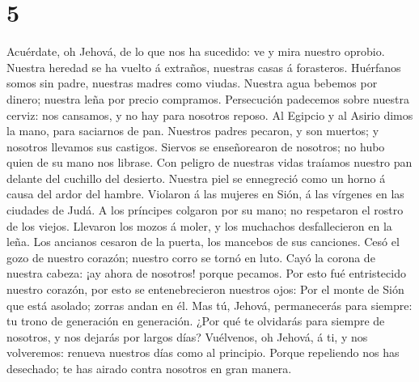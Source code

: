 \hypertarget{section-4}{%
\section{5}\label{section-4}}

 Acuérdate, oh Jehová, de lo que nos ha sucedido: ve y mira
nuestro oprobio.  Nuestra heredad se ha vuelto á extraños,
nuestras casas á forasteros.  Huérfanos somos sin padre,
nuestras madres como viudas.  Nuestra agua bebemos por
dinero; nuestra leña por precio compramos.  Persecución
padecemos sobre nuestra cerviz: nos cansamos, y no hay para nosotros
reposo.  Al Egipcio y al Asirio dimos la mano, para
saciarnos de pan.  Nuestros padres pecaron, y son muertos; y
nosotros llevamos sus castigos.  Siervos se enseñorearon de
nosotros; no hubo quien de su mano nos librase.  Con peligro
de nuestras vidas traíamos nuestro pan delante del cuchillo del
desierto.  Nuestra piel se ennegreció como un horno á causa
del ardor del hambre.  Violaron á las mujeres en Sión, á
las vírgenes en las ciudades de Judá.  A los príncipes
colgaron por su mano; no respetaron el rostro de los viejos.
 Llevaron los mozos á moler, y los muchachos desfallecieron
en la leña.  Los ancianos cesaron de la puerta, los
mancebos de sus canciones.  Cesó el gozo de nuestro
corazón; nuestro corro se tornó en luto.  Cayó la corona de
nuestra cabeza: ¡ay ahora de nosotros! porque pecamos.  Por
esto fué entristecido nuestro corazón, por esto se entenebrecieron
nuestros ojos:  Por el monte de Sión que está asolado;
zorras andan en él.  Mas tú, Jehová, permanecerás para
siempre: tu trono de generación en generación.  ¿Por qué te
olvidarás para siempre de nosotros, y nos dejarás por largos días?
 Vuélvenos, oh Jehová, á ti, y nos volveremos: renueva
nuestros días como al principio.  Porque repeliendo nos has
desechado; te has airado contra nosotros en gran manera.
